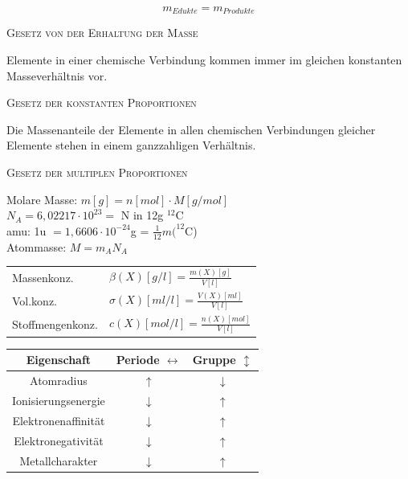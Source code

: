 \documentclass[12pt,a4paper]{article}
\renewcommand{\=}[1]{\stackrel{#1}{=}}
\theoremstyle{definition}
\theoremstyle{remark}
\begin{document}
\begin{center}
\begin{minipage}[t]{.45\linewidth}
\vspace{0pt}

\begin{framed}
$$m_{Edukte} = m_{Produkte}$$
\begin{center}
\textsc{Gesetz von der Erhaltung der Masse}
\end{center}
\end{framed}

\begin{framed}
Elemente in einer chemische Verbindung kommen immer im gleichen konstanten Masseverhältnis vor.
\begin{center}
\textsc{Gesetz der konstanten Proportionen}
\end{center}
\end{framed}

\begin{framed}
Die Massenanteile der Elemente in allen chemischen Verbindungen gleicher Elemente stehen in einem ganzzahligen Verhältnis.
\begin{center}
\textsc{Gesetz der multiplen Proportionen}
\end{center}
\end{framed}

\end{minipage}%
\hspace{0.02\linewidth}
\begin{minipage}[t]{.45\linewidth}
\vspace{0pt}

Molare Masse: $m[g] = n[mol] \cdot M[g/mol]$\\
$N_A = 6,02217 \cdot 10^{23} =$ N in 12g $^{12}$C\\
amu: 1u $= 1,6606 \cdot 10^{-24}$g = $\frac{1}{12} m(^{12}$C)\\
Atommasse: $M = m_A N_A$\\

\begin{tabular}{ll}
Massenkonz. & $\beta(X)[g/l] = \frac{m(X)[g]}{V[l]}$\\
Vol.konz. & $\sigma(X)[ml/l] = \frac{V(X)[ml]}{V[l]}$\\
Stoffmengenkonz. & $c(X)[mol/l] = \frac{n(X)[mol]}{V[l]}$\\
\end{tabular}

\begin{tabular}{c|c|c}
Eigenschaft & Periode $\leftrightarrow$ & Gruppe $\updownarrow$\\
\hline
Atomradius & $\uparrow$ & $\downarrow$\\
Ionisierungsenergie & $\downarrow$ & $\uparrow$\\
Elektronenaffinität & $\downarrow$ & $\uparrow$\\
Elektronegativität & $\downarrow$ & $\uparrow$\\
Metallcharakter & $\downarrow$& $\uparrow$
\end{tabular}

\end{minipage}
\end{center}
\end{document}
